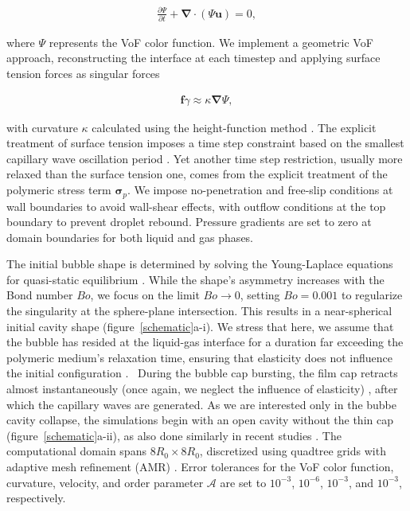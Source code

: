 \documentclass{jfm}
\newcommand{\oo}{\color{magenta} \normalfont}
\newcommand{\bb}{\color{black} \normalfont}
\begin{document}
\begin{align}
	\frac{\partial \Psi}{\partial t} + \boldsymbol{\nabla\cdot}\left(\Psi\boldsymbol{u}\right) = 0,
	\label{volfracconserve}
\end{align}

\noindent where $\Psi$ represents the VoF color function. We implement a geometric VoF approach, reconstructing the interface at each timestep and applying surface tension forces as singular forces \citep{popinet2009accurate, brackbill1992continuum}

\begin{align}
	\boldsymbol{f}{\gamma} \approx \kappa \boldsymbol{\nabla} \Psi,
	\label{f}
\end{align}

\noindent with curvature $\kappa$ calculated using the height-function method \citep{popinet2018numerical}. The explicit treatment of surface tension imposes a time step constraint based on the smallest capillary wave oscillation period \citep{popinet2009accurate}. Yet another time step restriction, usually more relaxed than the surface tension one, comes from the explicit treatment of the polymeric stress term $\boldsymbol{\sigma}_p$.
We impose no-penetration and free-slip conditions at wall boundaries to avoid wall-shear effects, with outflow conditions at the top boundary to prevent droplet rebound. Pressure gradients are set to zero at domain boundaries for both liquid and gas phases.

The initial bubble shape is determined by solving the Young-Laplace equations for quasi-static equilibrium \citep{princen1963shape,toba1959drop,villermaux2022bubbles,VatsalThesis}.
While the shape's asymmetry increases with the Bond number $Bo$, we focus on the limit $Bo \to 0$, setting $Bo = 0.001$ to regularize the singularity at the sphere-plane intersection. This results in a near-spherical initial cavity shape (figure~\ref{schematic}a-i).
\oo We stress that here, we assume that the bubble has resided at the liquid-gas interface for a duration far exceeding the polymeric medium's relaxation time, ensuring that elasticity does not influence the initial configuration \citep{ari2024bursting}.\bb\,
During the bubble cap bursting, the film cap retracts almost instantaneously \oo(once again, we neglect the influence of elasticity)\bb, after which the capillary waves are generated.
As we are interested only in the bubbe cavity collapse, the simulations begin with an open cavity without the thin cap (figure~\ref{schematic}a-ii), as also done similarly in recent studies \citep{deike2018dynamics, gordillo2019capillary,sanjay2021bursting}. The computational domain spans $8R_0 \times 8R_0$, discretized using quadtree grids with adaptive mesh refinement (AMR) \citep{popinet2009accurate}. Error tolerances for the VoF color function, curvature, velocity, and order parameter $\boldsymbol{\mathcal{A}}$ are set to $10^{-3}$, $10^{-6}$, $10^{-3}$, and $10^{-3}$, respectively.
\end{document}
